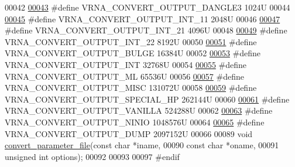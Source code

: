 \begin{DoxyCode}
00042 
\hyperlink{group__energy__parameters__convert_ga34a8a5479ef885834ef32f3fb43d79bc}{00043} \textcolor{preprocessor}{#define VRNA\_CONVERT\_OUTPUT\_DANGLE3       1024U}
00044 
\hyperlink{group__energy__parameters__convert_ga079aafefd5f8ab57ee5120099a34bd25}{00045} \textcolor{preprocessor}{#define VRNA\_CONVERT\_OUTPUT\_INT\_11        2048U}
00046 
\hyperlink{group__energy__parameters__convert_gacf770881d9034431ebe741642342a1f9}{00047} \textcolor{preprocessor}{#define VRNA\_CONVERT\_OUTPUT\_INT\_21        4096U}
00048 
\hyperlink{group__energy__parameters__convert_gaa307671e2631cdacad9cbe4c6583b05f}{00049} \textcolor{preprocessor}{#define VRNA\_CONVERT\_OUTPUT\_INT\_22        8192U}
00050 
\hyperlink{group__energy__parameters__convert_ga7092fe0be4de6f02cc0bf08e81af726a}{00051} \textcolor{preprocessor}{#define VRNA\_CONVERT\_OUTPUT\_BULGE         16384U}
00052 
\hyperlink{group__energy__parameters__convert_gac5c2289fdf8ff1b980976d1613ff943a}{00053} \textcolor{preprocessor}{#define VRNA\_CONVERT\_OUTPUT\_INT           32768U}
00054 
\hyperlink{group__energy__parameters__convert_gaf2c8755d64eff3852aa45df9ac80a4fe}{00055} \textcolor{preprocessor}{#define VRNA\_CONVERT\_OUTPUT\_ML            65536U}
00056 
\hyperlink{group__energy__parameters__convert_ga46d5b1535ae86060b6317565b7c6b40b}{00057} \textcolor{preprocessor}{#define VRNA\_CONVERT\_OUTPUT\_MISC          131072U}
00058 
\hyperlink{group__energy__parameters__convert_gaa1ff48a79642d69579d1766561ec6db6}{00059} \textcolor{preprocessor}{#define VRNA\_CONVERT\_OUTPUT\_SPECIAL\_HP    262144U}
00060 
\hyperlink{group__energy__parameters__convert_ga0d4e8a836bb4864ab5129c085dbf592d}{00061} \textcolor{preprocessor}{#define VRNA\_CONVERT\_OUTPUT\_VANILLA       524288U}
00062 
\hyperlink{group__energy__parameters__convert_ga2eb0462f16939ddacdaf751a88d675ce}{00063} \textcolor{preprocessor}{#define VRNA\_CONVERT\_OUTPUT\_NINIO         1048576U}
00064 
\hyperlink{group__energy__parameters__convert_gac86976e9c2a55b3a6481ea60044f6098}{00065} \textcolor{preprocessor}{#define VRNA\_CONVERT\_OUTPUT\_DUMP          2097152U}
00066 
00089 \textcolor{keywordtype}{void} \hyperlink{group__energy__parameters__convert_gafbe538bc4eb2cf2a33326e1010005f8a}{convert\_parameter\_file}(\textcolor{keyword}{const} \textcolor{keywordtype}{char}    *iname,
00090                             \textcolor{keyword}{const} \textcolor{keywordtype}{char}    *oname,
00091                             \textcolor{keywordtype}{unsigned} \textcolor{keywordtype}{int}  options);
00092 
00093 
00097 \textcolor{preprocessor}{#endif}
\end{DoxyCode}
